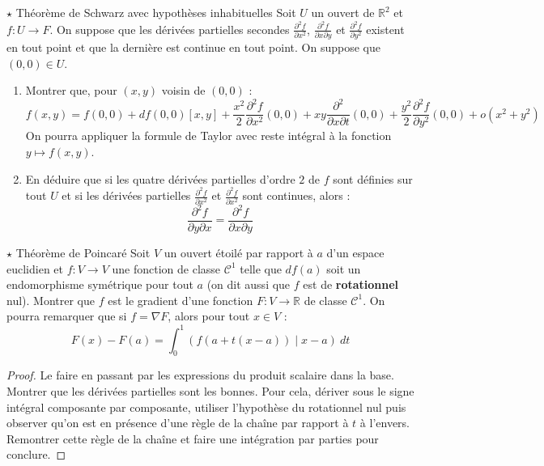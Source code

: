 \documentclass[french,a4paper]{article}
\newcommand{\R}{\mathbb{R}}
\theoremstyle{plain}
\theoremstyle{definition}
\theoremstyle{remark}
\begin{document}
\begin{ex}[Moulin.CD.30]{$\star$ Théorème de Schwarz avec hypothèses inhabituelles}
	Soit $U$ un ouvert de $\R^2$ et $f:U\to F$. On suppose que les dérivées partielles secondes $\displaystyle\frac{\partial^2f}{\partial x^2}$, $\displaystyle\frac{\partial^2f}{\partial x\partial y}$ et $\displaystyle\frac{\partial^2f}{\partial y^2}$ existent en tout point et que la dernière est continue en tout point. On suppose que $(0,0)\in U$.
	\begin{enumerate}
		\item Montrer que, pour $(x,y)$ voisin de $(0,0)$ : $$f(x,y)=f(0,0)+df(0,0)[x,y]+\frac{x^2}{2}\frac{\partial^2 f}{\partial x^2}(0,0)+xy\frac{\partial^2}{\partial x\partial t}(0,0)+\frac{y^2}{2}\frac{\partial^2 f}{\partial y^2}(0,0)+o(x^2+y^2)$$ On pourra appliquer la formule de Taylor avec reste intégral à la fonction $y\mapsto f(x,y)$.
		\item En déduire que si les quatre dérivées partielles d'ordre $2$ de $f$ sont définies sur tout $U$ et si les dérivées partielles $\displaystyle\frac{\partial^2f}{\partial x^2}$ et $\displaystyle\frac{\partial^2f}{\partial x^2}$ sont continues, alors : $$\displaystyle\frac{\partial^2f}{\partial y\partial x}=\displaystyle\frac{\partial^2f}{\partial x\partial y}$$
	\end{enumerate}
\end{ex}

\begin{ex}[Moulin.CD.31]{$\star$ Théorème de Poincaré}
	Soit $V$ un ouvert étoilé par rapport à $a$ d'un espace euclidien et $f:V\to V$ une fonction de classe $\mathcal{C}^1$ telle que $df(a)$ soit un endomorphisme symétrique pour tout $a$ (on dit aussi que $f$ est de \textbf{rotationnel} nul). Montrer que $f$ est le gradient d'une fonction $F:V\to\R$ de classe $\mathcal{C}^1$. On pourra remarquer que si $f=\nabla F$, alors pour tout $x\in V$ : $$F(x)-F(a)=\int_{0}^{1}\left(f(a+t(x-a))\mid x-a\right)\ dt$$
\end{ex}
\begin{proof}
	Le faire en passant par les expressions du produit scalaire dans la base. Montrer que les dérivées partielles sont les bonnes. Pour cela, dériver sous le signe intégral composante par composante, utiliser l'hypothèse du rotationnel nul puis observer qu'on est en présence d'une règle de la chaîne par rapport à $t$ à l'envers. Remontrer cette règle de la chaîne et faire une intégration par parties pour conclure.
\end{proof}
\end{document}
